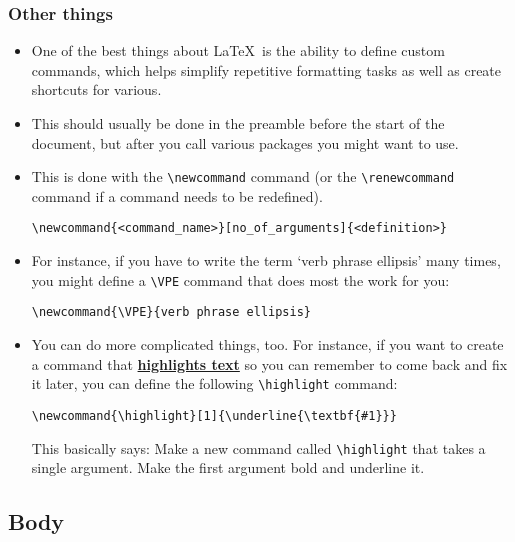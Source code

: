 \documentclass[11pt, letterpaper]{article}
\newcommand{\highlight}[1]{\underline{\textbf{#1}}}
\begin{document}
  
  \subsubsection{Other things}
  
    \begin{itemize}
      \item One of the best things about \LaTeX\ is the ability to define custom commands, which helps simplify repetitive formatting tasks as well as create shortcuts for various.
      
      \item This should usually be done in the preamble before the start of the document, but after you call various packages you might want to use.
      
      \item This is done with the \verb+\newcommand+ command (or the \verb+\renewcommand+ command if a command needs to be redefined).
      
	\begin{exe}
	  \ex \verb+\newcommand{<command_name>}[no_of_arguments]{<definition>}+
	\end{exe}

      
      \item For instance, if you have to write the term `verb phrase ellipsis' many times, you might define a \verb+\VPE+ command that does most the work for you:
      
	\begin{exe}
	  \ex \verb+\newcommand{\VPE}{verb phrase ellipsis}+
	\end{exe}

      
      \item You can do more complicated things, too. For instance, if you want to create a command that \highlight{highlights text} so you can remember to come back and fix it later, you can define the following \verb+\highlight+ command:
      
	\begin{exe}
	  \ex \verb+\newcommand{\highlight}[1]{\underline{\textbf{#1}}}+
	\end{exe}

      	This basically says: Make a new command called \verb+\highlight+ that takes a single argument. Make the first argument bold and underline it.

      
    \end{itemize}

  
  \subsection{Body}
  
\end{document}
